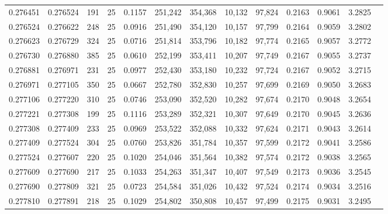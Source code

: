 \begin{tabular}{rrrrrrrrrrrrr}
0.276451 & 0.276524 &   191 &  25 &                                     0.1157 & 251,242 & 354,368 &  10,132 &  97,824 & 0.2163 & 0.9061 & 3.2825 \\
0.276524 & 0.276622 &   248 &  25 &                                     0.0916 & 251,490 & 354,120 &  10,157 &  97,799 & 0.2164 & 0.9059 & 3.2802 \\
0.276623 & 0.276729 &   324 &  25 &                                     0.0716 & 251,814 & 353,796 &  10,182 &  97,774 & 0.2165 & 0.9057 & 3.2772 \\
0.276730 & 0.276880 &   385 &  25 &                                     0.0610 & 252,199 & 353,411 &  10,207 &  97,749 & 0.2167 & 0.9055 & 3.2737 \\
0.276881 & 0.276971 &   231 &  25 &                                     0.0977 & 252,430 & 353,180 &  10,232 &  97,724 & 0.2167 & 0.9052 & 3.2715 \\
0.276971 & 0.277105 &   350 &  25 &                                     0.0667 & 252,780 & 352,830 &  10,257 &  97,699 & 0.2169 & 0.9050 & 3.2683 \\
0.277106 & 0.277220 &   310 &  25 &                                     0.0746 & 253,090 & 352,520 &  10,282 &  97,674 & 0.2170 & 0.9048 & 3.2654 \\
0.277221 & 0.277308 &   199 &  25 &                                     0.1116 & 253,289 & 352,321 &  10,307 &  97,649 & 0.2170 & 0.9045 & 3.2636 \\
0.277308 & 0.277409 &   233 &  25 &                                     0.0969 & 253,522 & 352,088 &  10,332 &  97,624 & 0.2171 & 0.9043 & 3.2614 \\
0.277409 & 0.277524 &   304 &  25 &                                     0.0760 & 253,826 & 351,784 &  10,357 &  97,599 & 0.2172 & 0.9041 & 3.2586 \\
0.277524 & 0.277607 &   220 &  25 &                                     0.1020 & 254,046 & 351,564 &  10,382 &  97,574 & 0.2172 & 0.9038 & 3.2565 \\
0.277609 & 0.277690 &   217 &  25 &                                     0.1033 & 254,263 & 351,347 &  10,407 &  97,549 & 0.2173 & 0.9036 & 3.2545 \\
0.277690 & 0.277809 &   321 &  25 &                                     0.0723 & 254,584 & 351,026 &  10,432 &  97,524 & 0.2174 & 0.9034 & 3.2516 \\
0.277810 & 0.277891 &   218 &  25 &                                     0.1029 & 254,802 & 350,808 &  10,457 &  97,499 & 0.2175 & 0.9031 & 3.2495 \\

\end{tabular}
